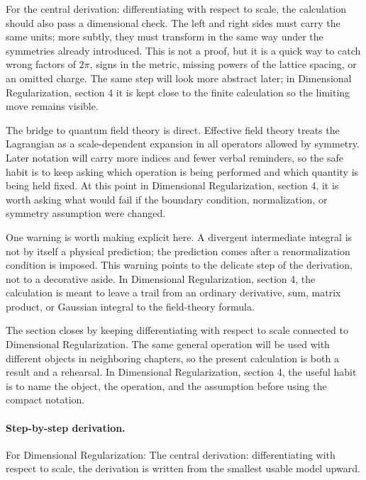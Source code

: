For the central derivation: differentiating with respect to scale, the calculation should also pass a dimensional check.  The left and right sides must carry the same units; more subtly, they must transform in the same way under the symmetries already introduced.  This is not a proof, but it is a quick way to catch wrong factors of \(2\pi\), signs in the metric, missing powers of the lattice spacing, or an omitted charge.  The same step will look more abstract later; in Dimensional Regularization, section 4 it is kept close to the finite calculation so the limiting move remains visible.

The bridge to quantum field theory is direct.  Effective field theory treats the Lagrangian as a scale-dependent expansion in all operators allowed by symmetry.  Later notation will carry more indices and fewer verbal reminders, so the safe habit is to keep asking which operation is being performed and which quantity is being held fixed.  At this point in Dimensional Regularization, section 4, it is worth asking what would fail if the boundary condition, normalization, or symmetry assumption were changed.

One warning is worth making explicit here.  A divergent intermediate integral is not by itself a physical prediction; the prediction comes after a renormalization condition is imposed.  This warning points to the delicate step of the derivation, not to a decorative aside.  In Dimensional Regularization, section 4, the calculation is meant to leave a trail from an ordinary derivative, sum, matrix product, or Gaussian integral to the field-theory formula.

The section closes by keeping differentiating with respect to scale connected to Dimensional Regularization.  The same general operation will be used with different objects in neighboring chapters, so the present calculation is both a result and a rehearsal.  In Dimensional Regularization, section 4, the useful habit is to name the object, the operation, and the assumption before using the compact notation.



\paragraph{Step-by-step derivation.}

For Dimensional Regularization: The central derivation: differentiating with respect to scale, the derivation is written from the smallest usable model upward.

